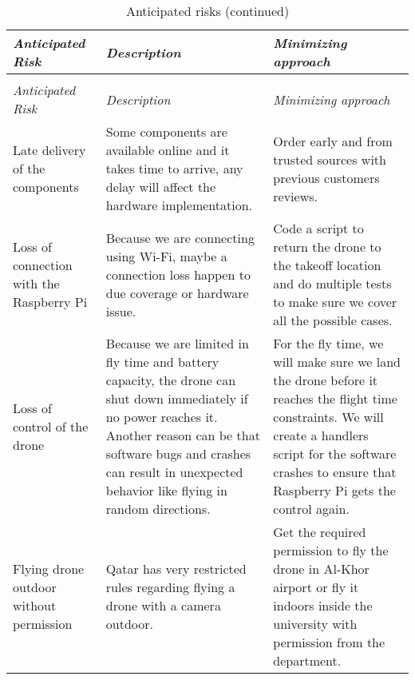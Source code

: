 \documentclass[../main.tex]{subfiles}
\begin{document}
\begin{center}
    \begin{xltabular}{\textwidth}{ L{4cm} X X }
        \caption{Anticipated risks.}
        \label{tab:risks} \\
        \toprule
        \textit{Anticipated Risk} 
        & \textit{Description} 
        & \textit{Minimizing approach} \\
        \midrule
        \endfirsthead

        \caption[]{Anticipated risks (continued)} \\
        \toprule
        \textit{Anticipated Risk} 
        & \textit{Description} 
        & \textit{Minimizing approach} \\
        \midrule
        \endhead

        Late delivery of the components 
        & Some components are available online 
        and it takes time to arrive, 
        any delay will affect the hardware implementation.
        & Order early and from trusted sources with previous 
        customers reviews. \\
        
        Loss of connection with the Raspberry Pi
        & Because we are connecting using Wi-Fi, 
        maybe a connection loss 
        happen to due coverage or hardware issue.
        & Code a script to return the drone 
        to the takeoff location 
        and do multiple tests to make sure 
        we cover all the possible cases. \\
        
        Loss of control of the drone
        & Because we are limited in fly time 
        and battery capacity, 
        the drone can shut down immediately if 
        no power reaches it.
        Another reason can be that software bugs 
        and crashes can 
        result in unexpected behavior like flying 
        in random directions.
        & For the fly time, we will make sure 
        we land the drone before it reaches 
        the flight time constraints.
        We will create a handlers script 
        for the software crashes 
        to ensure that Raspberry Pi gets the 
        control again.  \\
        
        Flying drone outdoor without permission 
        & Qatar has very restricted rules regarding flying 
        a drone 
        with a camera outdoor.
        & Get the required permission to fly the drone in 
        Al-Khor airport or fly it indoors inside the 
        university with permission from the department. \\


\end{xltabular}
\end{center}
\end{document}
